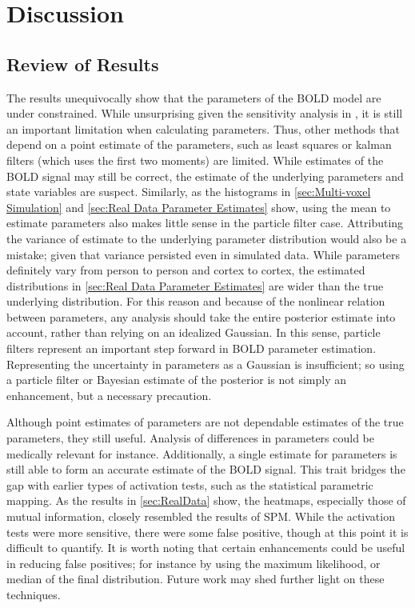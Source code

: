\chapter{Discussion}
\label{sec:Discussion}
\section{Review of Results}
The results unequivocally show that the parameters of the BOLD model are under
constrained. While unsurprising given the sensitivity analysis in \cite{Deneux2006},
it is still an important limitation when calculating parameters. Thus, other methods
that depend on a point estimate of the parameters, such as least squares 
or kalman filters (which uses the first two moments) are limited. While estimates of
the  BOLD signal may still be correct, the estimate
of the underlying parameters and state variables are suspect. Similarly, as the
histograms in \autoref{sec:Multi-voxel Simulation} and \autoref{sec:Real Data Parameter Estimates}
show, using the mean to estimate parameters also makes little sense in the particle filter
case. Attributing the variance of estimate to the underlying parameter distribution would
also be a mistake; given that variance persisted even in simulated data. While parameters 
definitely vary from person to person and cortex to cortex, the estimated distributions 
in \autoref{sec:Real Data Parameter Estimates} are wider than the true underlying 
distribution. For this reason and because of the nonlinear relation between
parameters, any analysis should take the entire posterior estimate into account, 
rather than relying on an idealized Gaussian. In this sense, particle filters represent
an important step forward in BOLD parameter estimation. Representing
the uncertainty in parameters as a Gaussian is insufficient; so using a particle filter
or Bayesian estimate of the posterior is not simply an enhancement, but a necessary precaution.

Although point estimates of parameters are not dependable estimates of the 
true parameters, they still useful. Analysis of differences in parameters
could be medically relevant for instance. Additionally, a single estimate for parameters is still able
to form an accurate estimate of the BOLD signal. This trait bridges the gap with earlier types 
of activation tests, such as the statistical
parametric mapping. As the results in \autoref{sec:RealData} show, the heatmaps, especially
those of mutual information, closely resembled the results of SPM. While the activation
tests were more sensitive, there were some false positive, though at this point it is
difficult to quantify. It is
worth noting that certain enhancements could be useful in reducing false positives; for instance
by using the maximum likelihood, or median of the final distribution.  Future work may 
shed further light on these techniques. 

